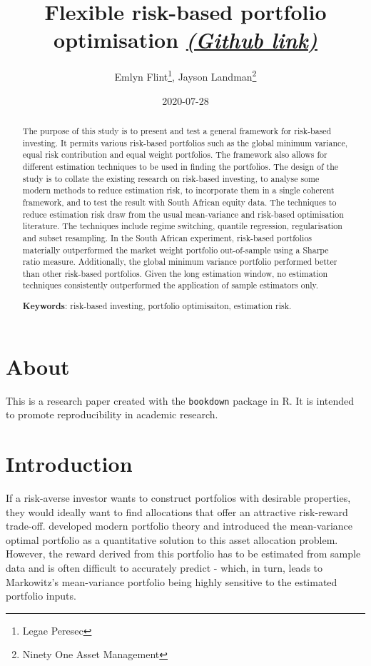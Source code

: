 \documentclass[
]{article}
\title{Flexible risk-based portfolio optimisation
\href{https://github.com/jhlandman/flex_rb_opt}{\emph{(Github link)}}}
\author{Emlyn Flint\footnote{Legae Peresec}, Jayson Landman\footnote{Ninety One Asset Management}}
\date{2020-07-28}
\begin{document}
\maketitle
\begin{abstract}
The purpose of this study is to present and test a general framework for risk-based investing. It permits various risk-based portfolios such as the global minimum variance, equal risk contribution and equal weight portfolios. The framework also allows for different estimation techniques to be used in finding the portfolios. The design of the study is to collate the existing research on risk-based investing, to analyse some modern methods to reduce estimation risk, to incorporate them in a single coherent framework, and to test the result with South African equity data. The techniques to reduce estimation risk draw from the usual mean-variance and risk-based optimisation literature. The techniques include regime switching, quantile regression, regularisation and subset resampling. In the South African experiment, risk-based portfolios materially outperformed the market weight portfolio out-of-sample using a Sharpe ratio measure. Additionally, the global minimum variance portfolio performed better than other risk-based portfolios. Given the long estimation window, no estimation techniques consistently outperformed the application of sample estimators only.

\textbf{Keywords}: risk-based investing, portfolio optimisaiton, estimation risk.
\end{abstract}

{
\setcounter{tocdepth}{2}
\tableofcontents
}
\hypertarget{about}{%
\section{About}\label{about}}

This is a research paper created with the \texttt{bookdown} package in R. It is intended to promote
reproducibility in academic research.

\hypertarget{introduction}{%
\section{Introduction}\label{introduction}}

If a risk-averse investor wants to construct portfolios with desirable properties, they would
ideally want to find allocations that offer an attractive risk-reward trade-off. \citet{M52} developed
modern portfolio theory and introduced the mean-variance optimal portfolio as a quantitative
solution to this asset allocation problem. However, the reward derived from this portfolio has to be
estimated from sample data and is often difficult to accurately predict - which, in turn, leads to
Markowitz's mean-variance portfolio being highly sensitive to the estimated portfolio inputs.
\end{document}
